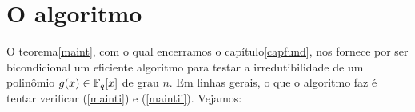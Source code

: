 
\chapter{O algoritmo}\label{capalg}

O teorema\xspace\ref{maint}, com o qual encerramos o
capítulo\xspace\ref{capfund}, nos fornece por ser bicondicional
um eficiente algoritmo para
testar a irredutibilidade de um polinômio $g(x)\in\mathbb{F}_{q}[x]$ de grau
$n$. Em linhas gerais, o que o algoritmo faz é tentar verificar
(\ref{mainti}) e (\ref{maintii}). Vejamos:

